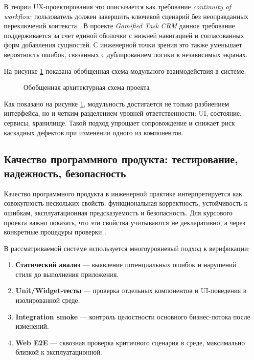 В теории UX-проектирования это описывается как требование \textit{continuity of workflow}: пользователь должен завершить ключевой сценарий без неоправданных переключений контекста \cite{uxBook2023}. В проекте \textit{Gamified Task CRM} данное требование поддерживается за счет единой оболочки с нижней навигацией и согласованных форм добавления сущностей. С инженерной точки зрения это также уменьшает вероятность ошибок, связанных с дублированием логики в независимых экранах.

На рисунке \ref{fig:architecture} показана обобщенная схема модульного взаимодействия в системе.

\begin{figure}[h!]
\centering
{}
\caption{Обобщенная архитектурная схема проекта}
\label{fig:architecture}
\end{figure}

Как показано на рисунке \ref{fig:architecture}, модульность достигается не только разбиением интерфейса, но и четким разделением уровней ответственности: UI, состояние, сервисы, хранилище. Такой подход упрощает сопровождение и снижает риск каскадных дефектов при изменении одного из компонентов.

\subsection{Качество программного продукта: тестирование, надежность, безопасность}

Качество программного продукта в инженерной практике интерпретируется как совокупность нескольких свойств: функциональная корректность, устойчивость к ошибкам, эксплуатационная предсказуемость и безопасность. Для курсового проекта важно показать, что эти свойства учитываются не декларативно, а через конкретные процедуры проверки \cite{testingBook,owaspM10}.

В рассматриваемой системе используется многоуровневый подход к верификации:
\begin{enumerate}
  \item \textbf{Статический анализ} --- выявление потенциальных ошибок и нарушений стиля до выполнения приложения.
  \item \textbf{Unit/Widget-тесты} --- проверка отдельных компонентов и UI-поведения в изолированной среде.
  \item \textbf{Integration smoke} --- контроль целостности основного бизнес-потока после изменений.
  \item \textbf{Web E2E} --- сквозная проверка критичного сценария в среде, максимально близкой к эксплуатационной.
\end{enumerate}

